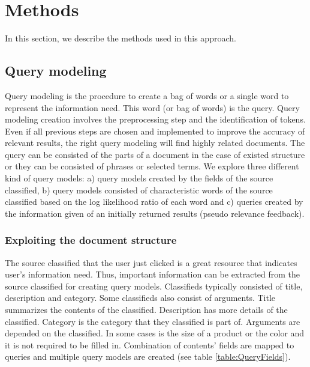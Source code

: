 \chapter{Methods}

In this section, we describe the methods used in this approach.

\section{Query modeling}

Query modeling is the procedure to create a bag of words or a single word to represent the information need. This word (or bag of words) is the query. Query modeling creation involves the preprocessing step and the identification of tokens. Even if all previous steps are chosen and implemented to improve the accuracy of relevant results, the right query modeling will find highly related documents. The query can be consisted of the parts of a document in the case of existed structure or they can be consisted of phrases or selected terms. We explore three different kind of query models: a) query models created by the fields of the source classified, b) query models consisted of characteristic words of the source classified based on the log likelihood ratio of each word and c) queries created by the information given of an initially returned results (pseudo relevance feedback).

\subsection{Exploiting the document structure}

The source classified that the user just clicked is a great resource that indicates user's information need. Thus, important information can be extracted from the source classified for creating query models. Classifieds typically consisted of title, description and category. Some classifieds also consist of arguments. Title summarizes the contents of the classified. Description has more details of the classified. Category is the category that they classified is part of. Arguments are depended on the classified. In some cases is the size of a product or the color and it is not required to be filled in. Combination of contents' fields are mapped to queries and multiple query models are created (see table \ref{table:QueryFields}).


